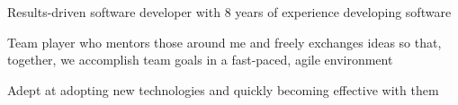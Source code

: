 %
    \begin{itemize*}
        \item Results-driven software developer with 8 years of experience developing software
        \item Team player who mentors those around me and freely exchanges ideas so that, together, we accomplish team goals in a fast-paced, agile environment
        \item Adept at adopting new technologies and quickly becoming effective with them
    \end{itemize*}
